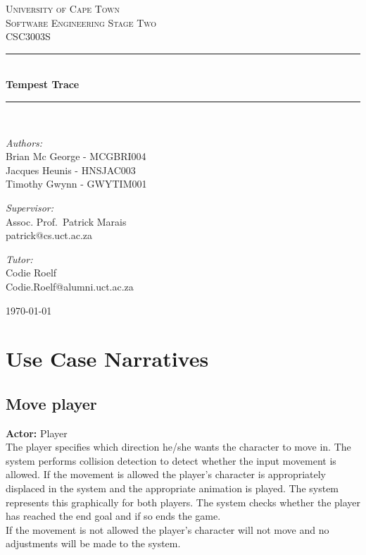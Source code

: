 \documentclass[a4paper,10pt]{article}
\begin{document}
\begin{titlepage} \begin{center} 
		\textsc{\LARGE University of Cape Town}
		\\[1.5cm] \textsc{\Large Software Engineering Stage Two\\CSC3003S}
		\\[0.5cm]
		\noindent\rule[0.4mm]{\textwidth}{0.1mm}
		\\[0.4cm] { \huge \bfseries Tempest Trace \\[0.4cm] }
		\noindent\rule[0.4mm]{\textwidth}{0.1mm}
		\\[1cm]
		\begin{minipage}[t]{0.4\textwidth}
		\begin{flushleft}\large \emph{Authors:}\\ Brian Mc George - MCGBRI004 \\ Jacques Heunis - HNSJAC003 \\ Timothy Gwynn - GWYTIM001\end{flushleft}
		 \end{minipage} \begin{minipage}[t]{0.4\textwidth} 
		\begin{flushright} \large \emph{Supervisor:} \\ Assoc. Prof.~Patrick Marais\\patrick@cs.uct.ac.za\end{flushright}
		\begin{flushright} \large \emph{Tutor:} \\ Codie Roelf\\Codie.Roelf@alumni.uct.ac.za\end{flushright}
		 \end{minipage} \vfill {\large \today}
		\end{center}
		\end{titlepage}
\newpage
\tableofcontents
\newpage

\section{Use Case Narratives}
\subsection{Move player}
\textbf{Actor:} Player\smallskip\\
The player specifies which direction he/she wants the character to move in. The system performs collision detection to detect whether the input movement is allowed. If the movement is allowed the player's character is appropriately displaced in the system and the appropriate animation is played. The system represents this graphically for both players. The system checks whether the player has reached the end goal and if so ends the game.\smallskip\\
If the movement is not allowed the player's character will not move and no adjustments will be made to the system.
\end{document}
